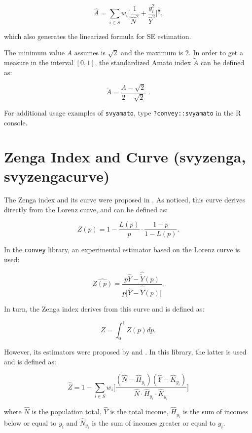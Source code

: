 \documentclass[]{book}
\begin{document}
\[
\widehat{A} = \sum_{i \in S} w_i \bigg[ \frac{1}{\widehat{N}^2} + \frac{y_i^2}{\widehat{Y}^2} \bigg]^{\frac{1}{2}} \text{,}
\]

which also generates the linearized formula for SE estimation.

The minimum value \(A\) assumes is \(\sqrt{2}\) and the maximum is \(2\). In order to get a measure in the interval \([0,1]\), the standardized Amato index \(\widetilde{A}\) can be defined as:

\[
\widetilde{A} = \frac{ A - \sqrt{2} }{2 - \sqrt{2} } \text{ .}
\]

For additional usage examples of \texttt{svyamato}, type \texttt{?convey::svyamato} in the R console.

\hypertarget{zenga-index-and-curve-svyzenga-svyzengacurve}{%
\section{Zenga Index and Curve (svyzenga, svyzengacurve)}\label{zenga-index-and-curve-svyzenga-svyzengacurve}}

The Zenga index and its curve were proposed in \citet{zenga2007}. As \citet{polisicchio2011} noticed, this curve derives directly from the Lorenz curve, and can be defined as:

\[
Z(p) = 1 - \frac{L(p)}{p} \cdot \frac{1 - p}{1 - L(p)}.
\]

In the \texttt{convey} library, an experimental estimator based on the Lorenz curve is used:

\[
\widehat{Z(p)} = \frac{ p \widehat{Y} - \widehat{\widetilde{Y}}(p) }{p \big[ \widehat{Y} - \widehat{\widetilde{Y}}(p) \big] }.
\]

In turn, the Zenga index derives from this curve and is defined as:

\[
Z = \int_0^1 Z(p)dp.
\]

However, its estimators were proposed by \citet{langel2012} and \citet{barabesi2016}. In this library, the latter is used and is defined as:

\[
\widehat{Z} = 1 - \sum_{i \in S} w_i \bigg[ \frac{ ( \widehat{N} - \widehat{H}_{y_i} ) ( \widehat{Y} -\widehat{K}_{y_i} ) }
{ \widehat{N} \cdot \widehat{H}_{y_i} \cdot \widehat{K}_{y_i} } \bigg]
\]

where \(\widehat{N}\) is the population total, \(\widehat{Y}\) is the total income, \(\widehat{H}_{y_i}\) is the sum of incomes below or equal to \(y_i\) and \(\widehat{N}_{y_i}\) is the sum of incomes greater or equal to \(y_i\).
\end{document}
